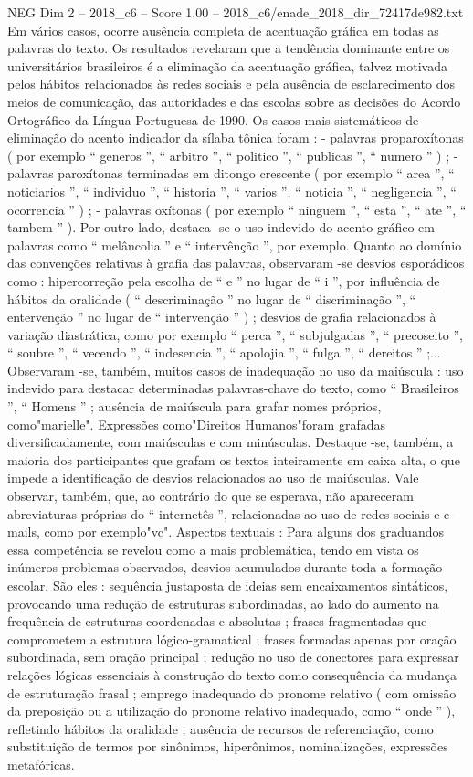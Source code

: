 \begin{textsample}{NEG Dim 2 – 2018\_c6 – Score 1.00 – 2018\_c6/enade\_2018\_dir\_72417de982.txt}
Em vários casos, ocorre ausência completa de acentuação gráfica em todas as palavras do texto.
Os resultados revelaram que a tendência dominante entre os universitários brasileiros é a eliminação da acentuação gráfica, talvez motivada pelos hábitos relacionados às redes sociais e pela ausência de esclarecimento dos meios de comunicação, das autoridades e das escolas sobre as decisões do Acordo Ortográfico da Língua Portuguesa de 1990.
Os casos mais sistemáticos de eliminação do acento indicador da sílaba tônica foram : - palavras proparoxítonas ( por exemplo “ generos ”, “ arbitro ”, “ politico ”, “ publicas ”, “ numero ” ) ; - palavras paroxítonas terminadas em ditongo crescente ( por exemplo “ area ”, “ noticiarios ”, “ individuo ”, “ historia ”, “ varios ”, “ noticia ”, “ negligencia ”, “ ocorrencia ” ) ; - palavras oxítonas ( por exemplo “ ninguem ”, “ esta ”, “ ate ”, “ tambem ” ).
Por outro lado, destaca -se o uso indevido do acento gráfico em palavras como “ melâncolia ” e “ intervênção ”, por exemplo.
Quanto ao domínio das convenções relativas à grafia das palavras, observaram -se desvios esporádicos como : hipercorreção pela escolha de “ e ” no lugar de “ i ”, por influência de hábitos da oralidade ( “ descriminação ” no lugar de “ discriminação ”, “ entervenção ” no lugar de “ intervenção ” ) ; desvios de grafia relacionados à variação diastrática, como por exemplo “ perca ”, “ subjulgadas ”, “ precoseito ”, “ soubre ”, “ vecendo ”, “ indesencia ”, “ apolojia ”, “ fulga ”, “ dereitos ” ;...
Observaram -se, também, muitos casos de inadequação no uso da maiúscula : uso indevido para destacar determinadas palavras-chave do texto, como “ Brasileiros ”, “ Homens ” ; ausência de maiúscula para grafar nomes próprios, como"marielle".
Expressões como"Direitos Humanos"foram grafadas diversificadamente, com maiúsculas e com minúsculas.
Destaque -se, também, a maioria dos participantes que grafam os textos inteiramente em caixa alta, o que impede a identificação de desvios relacionados ao uso de maiúsculas.
Vale observar, também, que, ao contrário do que se esperava, não apareceram abreviaturas próprias do “ internetês ”, relacionadas ao uso de redes sociais e e-mails, como por exemplo"vc".
Aspectos textuais : Para alguns dos graduandos essa competência se revelou como a mais problemática, tendo em vista os inúmeros problemas observados, desvios acumulados durante toda a formação escolar.
São eles : sequência justaposta de ideias sem encaixamentos sintáticos, provocando uma redução de estruturas subordinadas, ao lado do aumento na frequência de estruturas coordenadas e absolutas ; frases fragmentadas que comprometem a estrutura lógico-gramatical ; frases formadas apenas por oração subordinada, sem oração principal ; redução no uso de conectores para expressar relações lógicas essenciais à construção do texto como consequência da mudança de estruturação frasal ; emprego inadequado do pronome relativo ( com omissão da preposição ou a utilização do pronome relativo inadequado, como “ onde ” ), refletindo hábitos da oralidade ; ausência de recursos de referenciação, como substituição de termos por sinônimos, hiperônimos, nominalizações, expressões metafóricas.

\end{textsample}

